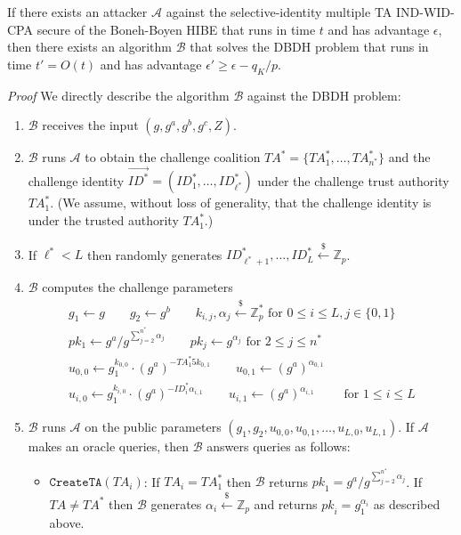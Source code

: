 \documentclass[10pt]{llncs}
\newcommand{\A}{\mathcal{A}}
\newcommand{\B}{\mathcal{B}}
\newcommand{\Zbb}{\mathbb{Z}}
\newcommand{\ID}{\mathit{ID}}
\newcommand{\TA}{\mathit{TA}}
\newcommand{\pk}{\mathit{pk}}
\newcommand{\getsr}{\stackrel{{\scriptscriptstyle\$}}{\gets}}
\begin{document}
\begin{theorem}
If there exists an attacker $\A$ against the selective-identity multiple TA IND-WID-CPA secure of the Boneh-Boyen HIBE that runs in time $t$ and has advantage $\epsilon$, then there exists an algorithm $\B$ that solves the DBDH problem that runs in time $t'=O(t)$ and has advantage $\epsilon' \geq \epsilon -q_{K}/p$.
\end{theorem}
\emph{Proof} We directly describe the algorithm $\B$ against the DBDH problem:
\begin{enumerate}
\item $\B$ receives the input $(g,g^{a},g^{b},g^{c},Z)$.
\item $\B$ runs $\A$ to obtain the challenge coalition $\TA^{*}=\{\TA^{*}_{1},\ldots,\TA^{*}_{n^{*}}\}$ and the challenge identity $\vec{\ID^{*}}=(\ID^{*}_{1},\ldots,\ID^{*}_{\ell^{*}})$ under the challenge trust authority $\TA^{*}_{1}$. (We assume, without loss of generality, that the challenge identity is under the trusted authority $\TA^{*}_{1}$.)
\item If $\ell^{*} < L$ then randomly generates $\ID^{*}_{\ell^{*}+1},\ldots,\ID^{*}_{L}\getsr \Zbb_{p}$.
\item $\B$ computes the challenge parameters
	\begin{displaymath}
	\begin{array}{c}
	g_{1} \gets g \qquad g_{2}\gets g^{b} \qquad k_{i,j}, \alpha_{j} \getsr \Zbb_{p}^{*} \mbox{ for } 0\leq i\leq L, j\in \{0,1\}\\
	pk_1 \gets g^{a}/g^{\sum_{j=2}^{n^{*}} \alpha_{j}} \qquad pk_j \gets g^{\alpha_{j}} \mbox{ for } 2\leq j\leq n^{*}\\
	u_{0,0} \gets g_{1}^{k_{0,0}}\cdot (g^{a})^{-\TA^{*}_{1}5k_{0,1}} \qquad u_{0,1} \gets (g^{a})^{\alpha_{0,1}}\\
	u_{i,0} \gets g_{1}^{k_{i,0}}\cdot (g^{a})^{-\ID^{*}_{i}\alpha_{i,1}} \qquad u_{i,1} \gets (g^{a})^{\alpha_{i,1}} \qquad \mbox{ for } 1\leq i\leq L
	\end{array}
	\end{displaymath}
\item $\B$ runs $\A$ on the public parameters $(g_{1},g_{2},u_{0,0},u_{0,1},\ldots,u_{L,0},u_{L,1})$. If $\A$ makes an oracle queries, then $\B$ answers queries as follows:
	\begin{itemize}
	\item $\texttt{CreateTA}(\TA_i)$: If $\TA_i = \TA^{*}_1$ then $\B$ returns $\pk_1 = g^{a}/g^{\sum_{j=2}^{n^{*}} \alpha_{j}}$. If $\TA \neq \TA^{*}$ then $\B$ generates $\alpha_i \getsr \Zbb_{p}$ and returns $\pk_i = g_{1}^{\alpha_i}$ as described above.

\end{itemize}
\end{enumerate}
\end{document}
